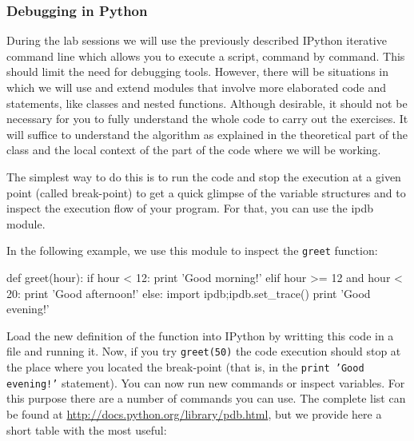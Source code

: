 \subsubsection{Debugging in Python}

During the lab sessions we will use the previously described IPython iterative command line which allows you to execute a script, command by command. This should limit the need for debugging tools. However, there will be situations in which we will use and extend modules that involve more elaborated code and statements, like classes and nested functions. Although desirable, it should not be necessary for you to fully understand the whole code to carry out the exercises. It will suffice to understand the algorithm as explained in the theoretical part of the class and the local context of the part of the code where we will be working. 

The simplest way to do this is to run the code and stop the execution at a given point (called break-point) to get a quick glimpse of the variable structures and to inspect the execution flow of your program. For that, you can use the ipdb module. 

In the following example, we use this module to inspect the \texttt{greet} function:

\begin{python}
def greet(hour):
    if hour < 12:
        print 'Good morning!'
    elif hour >= 12 and hour < 20:
        print 'Good afternoon!'
    else:
        import ipdb;ipdb.set_trace()
        print 'Good evening!'
\end{python}

Load the new definition of the function into IPython by writting this code in a file and running it. Now, if you try \texttt{greet(50)} the code execution should stop at the place where you located the break-point (that is, in the \texttt{print 'Good evening!'} statement). You can now run new commands or inspect variables. For this purpose there are a number of commands you can use. The complete list can be found at \url{http://docs.python.org/library/pdb.html}, but we provide here a short table with the most useful: 

